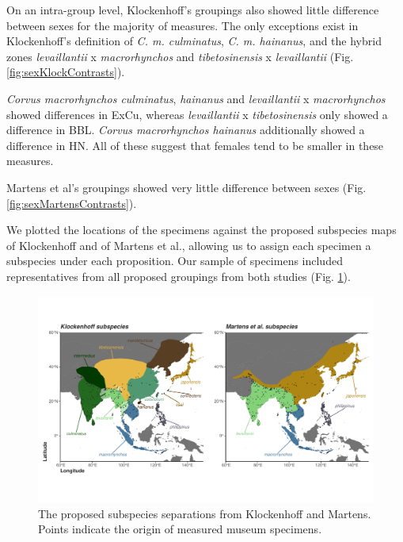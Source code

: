 \documentclass[10pt,a4paper]{article}
\begin{document}
On an intra-group level, Klockenhoff's groupings also showed little difference between sexes for the majority of measures.
The only exceptions exist in Klockenhoff's definition of \emph{C. m. culminatus}, \emph{C. m. hainanus}, and the hybrid zones \emph{levaillantii} x \emph{macrorhynchos} and \emph{tibetosinensis} x \emph{levaillantii} (Fig. \ref{fig:sexKlockContrasts}).

\emph{Corvus macrorhynchos culminatus}, \emph{hainanus} and \emph{levaillantii} x \emph{macrorhynchos} showed differences in ExCu, whereas \emph{levaillantii} x \emph{tibetosinensis} only showed a difference in BBL.
\emph{Corvus macrorhynchos hainanus} additionally showed a difference in HN.
All of these suggest that females tend to be smaller in these measures.

Martens et al's groupings showed very little difference between sexes (Fig. \ref{fig:sexMartensContrasts}).

We plotted the locations of the specimens against the proposed subspecies maps of Klockenhoff and of Martens et al., allowing us to assign each specimen a subspecies under each proposition.
Our sample of specimens included representatives from all proposed groupings from both studies (Fig. \ref{fig:subspeciesPlots}).

\begin{figure}
\includegraphics[width=0.9\linewidth]{../Figures/combined Subspecies Plot} \caption{The proposed subspecies separations from Klockenhoff and Martens. Points indicate the origin of measured museum specimens.}\label{fig:subspeciesPlots}
\end{figure}
\end{document}
